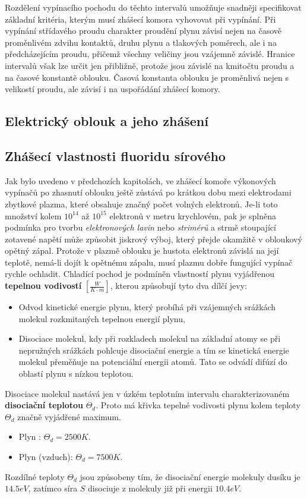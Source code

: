       Rozdělení vypínacího pochodu do těchto intervalů umožňuje snadněji specifikovat základní 
      kritéria, kterým musí zhášecí komora vyhovovat při vypínání. Při vypínání střídavého proudu 
      charakter proudění plynu závisí nejen na časově proměnlivém zdvihu kontaktů, druhu plynu a 
      tlakových poměrech, ale i na předcházejícím proudu, přičemž všechny veličiny jsou vzájemně 
      závislé. Hranice intervalů však lze určit jen přibližně, protože jsou závislé na kmitočtu 
      proudu a na časové konstantě oblouku. Časová konstanta oblouku je proměn\-livá nejen s 
      velikostí proudu, ale závisí i na uspořádání zhášecí komory.

  \subsection{Elektrický oblouk a jeho zhášení}
  \subsection{Zhášecí vlastnosti fluoridu sírového}
    Jak bylo uvedeno v předchozích kapitolách, ve zhášecí komoře vý\-ko\-no\-vých vypínačů po 
    zhasnutí oblouku ještě zůstává po krátkou dobu mezi elektrodami zbytkové plazma, které obsahuje 
    značný počet volných elektronů. Je-li toto množství kolem $10^{14}$ až $10^{15}$ elektronů v 
    metru krychlovém, pak je splněna podmínka pro tvorbu \emph{elektronových lavin} nebo 
    \emph{strimérů} a strmě stoupající zotavené napětí může způsobit jiskrový výboj, který přejde 
    okamžitě v obloukový opětný zápal. Protože v plazmě oblouku je hustota elektronů závislá na 
    její teplotě, nemá-li dojít k opětnému zápalu, musí plazmu dobře fungující vypínač rychle 
    ochladit. Chladící  pochod je podmíněn vlastností plynu vyjádřenou \textbf{tepelnou vodivostí}
    $[\frac{W}{K\cdot m}]$,  kterou způsobují tyto dva dílčí jevy:
    \begin{itemize}
      \item Odvod kinetické energie plynu, který probíhá při vzájemných srážkách molekul 
            rozkmitaných tepelnou energií plynu,
      \item Disociace molekul, kdy při rozkladech molekul na základní atomy se při ne\-pru\-žných
            srážkách pohlcuje disociační energie a tím se kinetická energie molekul pře\-mě\-ňu\-je
            na potenciální energii atomů. Tato se odvádí difúzí do oblastí plynu s nízkou teplotou.
    \end{itemize}
    Disociace molekul nastává jen v úzkém teplotním intervalu charakterizovaném \textbf{disociační 
    teplotou} $\Theta_d$. Proto má křivka tepelné vodivosti plynu kolem teploty $\Theta_d$ značně 
    vyjádřené maximum.
    \begin{itemize}
      \item Plyn : \(\Theta_d = 2500 K\).
      \item Plyn  (vzduch): \(\Theta_d = 7500 K\).
    \end{itemize}
    Rozdílné teploty $\Theta_d$ jsou způsobeny tím, že disociační energie molekuly dusíku 
    je $14.5 eV$, zatímco síra $S$ disociuje z molekuly  již při energii $10.4 eV$.
   
